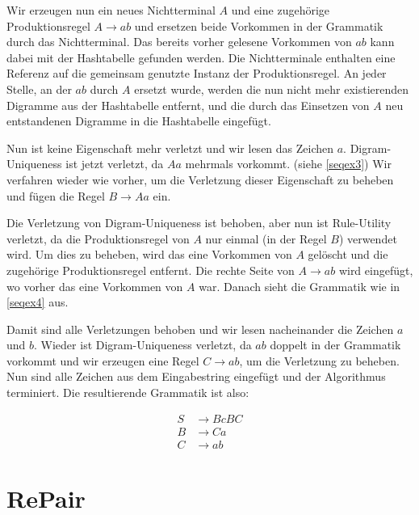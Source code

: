 Wir erzeugen nun ein neues Nichtterminal $A$ und eine zugehörige Produktionsregel $A \rightarrow ab$  und ersetzen beide Vorkommen in der Grammatik durch das Nichtterminal. Das bereits vorher gelesene Vorkommen von $ab$ kann dabei mit der Hashtabelle gefunden werden. 
Die Nichtterminale enthalten eine Referenz auf die gemeinsam genutzte Instanz der Produktionsregel. 
An jeder Stelle, an der $ab$ durch $A$ ersetzt wurde, werden die nun nicht mehr existierenden Digramme aus der Hashtabelle entfernt, und die durch das Einsetzen von $A$ neu entstandenen Digramme in die Hashtabelle eingefügt.

Nun ist keine Eigenschaft mehr verletzt und wir lesen das Zeichen $a$. Digram-Uniqueness ist jetzt verletzt, da $Aa$ mehrmals vorkommt. (siehe \autoref{seqex3})
Wir verfahren wieder wie vorher, um die Verletzung dieser Eigenschaft zu beheben und fügen die Regel $B \rightarrow Aa$ ein.

Die Verletzung von Digram-Uniqueness ist behoben, aber nun ist Rule-Utility verletzt, da die Produktionsregel von $A$ nur einmal (in der Regel $B$) verwendet wird.
Um dies zu beheben, wird das eine Vorkommen von $A$ gelöscht und die zugehörige Produktionsregel entfernt. Die rechte Seite von $A \rightarrow ab$ wird eingefügt, wo vorher das eine Vorkommen von $A$ war. Danach sieht die Grammatik wie in \autoref{seqex4} aus.

Damit sind alle Verletzungen behoben und wir lesen nacheinander die Zeichen $a$ und $b$.
Wieder ist Digram-Uniqueness verletzt, da $ab$ doppelt in der Grammatik vorkommt und wir erzeugen eine Regel $C \rightarrow ab$, um die Verletzung zu beheben. Nun sind alle Zeichen aus dem Eingabestring eingefügt und der Algorithmus terminiert. Die resultierende Grammatik ist also:

\begin{align*}
	S &\rightarrow BcBC\\
	B &\rightarrow Ca\\
	C &\rightarrow ab
\end{align*}



\section{RePair}
\label{repair}

